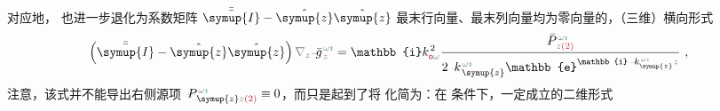对应地， 也进一步退化为系数矩阵 $\bar{\bar{\symup{I}}} - \hat{\symup{z}} \hat{\symup{z}}$ 最末行向量、最末列向量均为零向量的，（三维）横向形式
\begin{align}  \label{eq:simplify6-V2'-SVA-V_1singular-nokxky-zeta}
	\left( \bar{\bar{\symup{I}}} - \hat{\symup{z}} \hat{\symup{z}} \right) \mathcolor{gray}{\nabla_z} \Xint{{}^{}_{\mathcolor{gray}{-}}}{10}{\bar{g}}^{\;\!\mathcolor{gray}{\omega} \textcolor{ForestGreen}{\imath}}_{\;\! \mathcolor{gray}{z}} = \mathbb{i} k_{\textcolor{Maroon}{\mathsf{o}} \mathcolor{gray}{\omega}}^{\;\! 2} \frac{\Xint{\mathcolor{gray}{-}}{30}{\bar{P}}^{\;\! \mathcolor{gray}{\omega} \textcolor{ForestGreen}{\imath}}_{\;\! \mathcolor{gray}{z} \textcolor{Maroon}{(2)}}}{2 \Xint{\begin{smallmatrix} ~ \\ {}^{}_{\mathcolor{gray}{-}} \\ ~ \end{smallmatrix}}{15}{k}_{\;\! \symup{z}}^{\;\! \mathcolor{gray}{\omega} \textcolor{ForestGreen}{\imath}} \mathbb{e}^{\mathbb{i} \Xint{\begin{smallmatrix} ~ \\ {}^{}_{\mathcolor{gray}{-}} \\ ~ \end{smallmatrix}}{15}{k}_{\symup{z}}^{\;\! \mathcolor{gray}{\omega} \textcolor{ForestGreen}{\imath}} \mathcolor{gray}{z}}} ~,
\end{align}
注意，该式并不能导出右侧源项 $\Xint{\mathcolor{gray}{-}}{24}{P}^{\;\! \mathcolor{gray}{\omega} \textcolor{ForestGreen}{\imath}}_{\;\! \symup{z} \mathcolor{gray}{z} \textcolor{Maroon}{(2)}} \equiv 0$，而只是起到了将  化简为：在  条件下，一定成立的二维形式
